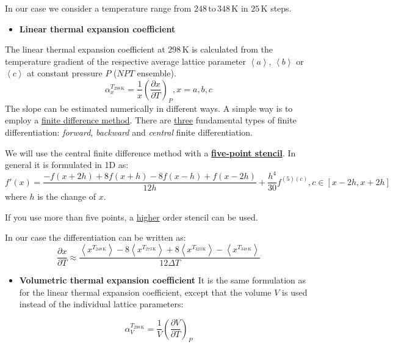 \documentclass[
  letterpaper,
  DIV=11,
  numbers=noendperiod]{scrreprt}
\providecommand{\tightlist}{%
  \setlength{\itemsep}{0pt}\setlength{\parskip}{0pt}}\usepackage{longtable,booktabs,array}
\begin{document}
In our case we consider a temperature range from
\(248\,\text{to}\,348\,\mathrm{K}\) in \(25\,\mathrm{K}\) steps.

\begin{itemize}
\tightlist
\item
  \textbf{Linear thermal expansion coefficient}
\end{itemize}

The linear thermal expansion coefficient at \(\mathrm{298}\,\mathrm{K}\)
is calculated from the temperature gradient of the respective average
lattice parameter \(\left < a \right >\), \(\left < b \right >\) or
\(\left < c\right >\) at constant pressure \(P\) (\(NPT\) ensemble). \[
\alpha _{x}^{T_{\mathrm{298\,K}}} = \frac{1}{x} \left ( \frac{\partial x}{\partial T} \right ) _{P}, x={a,b,c}
\] The slope can be estimated numerically in different ways. A simple
way is to employ a
\href{https://en.wikipedia.org/wiki/Finite_difference_method}{finite
difference method}. There are
\href{https://en.wikipedia.org/wiki/Finite_difference}{three}
fundamental types of finite differentiation: \emph{forward},
\emph{backward} and \emph{central} finite differentiation.

We will use the central finite difference method with a
\textbf{\href{https://en.wikipedia.org/wiki/Five-point_stencil}{five-point
stencil}}. In general it is formulated in 1D as: \[
f'(x) = \frac{-f(x+2h)+8f(x+h)-8f(x-h)+f(x-2h)}{12 h} + \frac{h^4}{30}f^{(5)(c)}, c \in [x-2h,x+2h]
\] where \(h\) is the change of \(x\).

If you use more than five points, a
\href{https://en.wikipedia.org/wiki/Finite_difference_coefficient}{higher}
order stencil can be used.

In our case the differentiation can be written as: \[
\frac{\partial x}{\partial T} \approx \frac{ \left < x^{T_{\mathrm{248\,K}}}\right >-8 \left < x^{T_{\mathrm{273\,K}}}\right > + 8 \left < x^{T_{\mathrm{323\,K}}}\right > - \left < x^{T_{\mathrm{348\,K}}} \right > }{12\Delta T}
\]

\begin{itemize}
\tightlist
\item
  \textbf{Volumetric thermal expansion coefficient} It is the same
  formulation as for the linear thermal expansion coefficient, except
  that the volume \(V\) is used instead of the individual lattice
  parameters:
\end{itemize}

\[
\alpha _{V}^{T_{\mathrm{298\,K}}} = \frac{1}{V} \left ( \frac{\partial V}{\partial T} \right ) _{P}
\]
\end{document}

